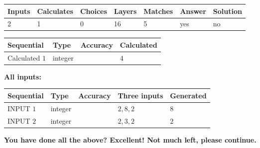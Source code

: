 \documentclass[12pt]{article}
\begin{document}
  
 
 
\noindent{}
 
 
 
   
   
   
   
\noindent\begin{tabular}{|l|l|l|l|l|l|l|}
 \hline
Inputs & Calculates & Choices & Layers & Matches & Answer & Solution \\ \hline
           2 & 
           1 & 
           0
  & 
          16 & 
           5 & 
  yes & 
  no 
  \\ \hline
 \end{tabular}
   
   
   
   
\noindent{}
   
   
  
  
\noindent\begin{tabular}{|l|l|l|l|}
\hline
 Sequential & Type & Accuracy & Calculated \\ 
\hline
 
 
  Calculated $           1$ & integer &  & 
  $ 4 $ 
 \\  \hline  
 \end{tabular}
   
   
   
   
\noindent\vspace{0.1in}\hspace{-0.08in} {\textbf{\Large{All inputs: }}}
   
   
  
  
\noindent\begin{tabular}{|l|l|l|l|l|}
\hline
 Sequential & Type & Accuracy & Three inputs & Generated \\ 
\hline
 
 
  INPUT $           1$ & integer &  & $
 2
 , 
 8
 , 
 2
 $ & $ 8 $ 
 \\  \hline  
 
 
  INPUT $           2$ & integer &  & $
 2
 , 
 3
 , 
 2
 $ & $ 2 $ 
 \\  \hline  
 \end{tabular}
   
   
   
   
\vspace{0.3in}
{\textbf{\LARGE{You have done all the above? Excellent! Not much left, please continue.}}}
\vspace{0.3in}
   
\end{document}
